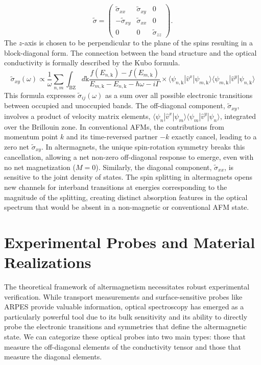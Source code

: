 \documentclass{article}
\begin{document}
\begin{equation}
    \tilde{\sigma} = \begin{pmatrix} \tilde{\sigma}_{xx} & \tilde{\sigma}_{xy} & 0 \\ -\tilde{\sigma}_{xy} & \tilde{\sigma}_{xx} & 0 \\ 0 & 0 & \tilde{\sigma}_{zz} \end{pmatrix}.
\end{equation}
The $z$-axis is chosen to be perpendicular to the plane of the spins resulting in a block-diagonal form.
The connection between the band structure and the optical conductivity is formally described by the Kubo formula.
\begin{equation}
    \tilde{\sigma}_{xy}(\omega) \propto \frac{1}{\omega} \sum_{n, m} \int_{\text{BZ}} d\text{k} \frac{f(E_{n, \text{{k}}}) - f(E_{m, \text{k}})}{{{E_{m, \text{k}} - E_{n, \text{k}} - \hbar \omega}} - i\Gamma} \times {\langle \psi_{n, \text{k}} | \hat{v}^{x} | \psi_{m, \text{k}}\rangle \langle{ \psi_{m, \text{k}} | \hat{v}^{y} | \psi_{n, \text{k}} }\rangle}
\end{equation}
This formula expresses $\tilde{\sigma}_{ij}(\omega)$ as a sum over all possible electronic transitions between occupied and unoccupied bands. The off-diagonal component, $\tilde{\sigma}_{xy}$, involves a product of velocity matrix elements, $\langle\psi_n|\hat v^x|\psi_m\rangle\langle\psi_m|\hat v^y|\psi_n\rangle$, integrated over the Brillouin zone. In conventional AFMs, the contributions from momentum point $k$ and its time-reversed partner $-k$ exactly cancel, leading to a zero net $\tilde{\sigma}_{xy}$. In altermagnets, the unique spin-rotation symmetry breaks this cancellation, allowing a net non-zero off-diagonal response to emerge, even with no net magnetization ($M=0$). Similarly, the diagonal component, $\tilde{\sigma}_{xx}$, is sensitive to the joint density of states. The spin splitting in altermagnets opens new channels for interband transitions at energies corresponding to the magnitude of the splitting, creating distinct absorption features in the optical spectrum that would be absent in a non-magnetic or conventional AFM state.

\section{Experimental Probes and Material Realizations}
The theoretical framework of altermagnetism necessitates robust experimental verification. While transport measurements and surface-sensitive probes like ARPES provide valuable information, optical spectroscopy has emerged as a particularly powerful tool due to its bulk sensitivity and its ability to directly probe the electronic transitions and symmetries that define the altermagnetic state. We can categorize these optical probes into two main types: those that measure the off-diagonal elements of the conductivity tensor and those that measure the diagonal elements.
\end{document}

